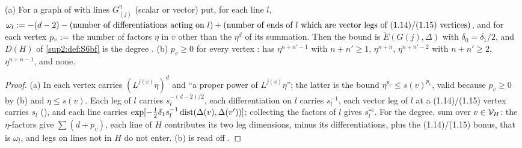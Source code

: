 \begin{lemma}\label{sup2:lem:S6inst}
\textup{(a)} For a graph of \cite[Sect.~1]{Ba3} with lines $G^\eta_{(j)}$ (scalar or vector) put, for each line $l$, $\omega_l:=-(d-2)-(\text{number of differentiations acting on }l)+(\text{number of ends of }l\text{ which are vector legs of (1.14)/(1.15) vertices})$, and for each vertex $p_v:=$ the number of factors $\eta$ in $v$ other than the $\eta^d$ of its summation. Then the bound \cite[(2.14)]{Ba3} is $\tilde E(G(j),\Delta)$ with $\delta_0=\delta_1/2$, and $D(H)$ of \cref{sup2:def:S6bf} is the degree \cite[(2.1)--(2.2)]{Ba3}. \textup{(b)} $p_v\ge0$ for every vertex \cite[(1.6)--(1.15)]{Ba3}: \cite[(1.8)]{Ba3} has $\eta^{n+n'-1}$ with $n+n'\ge1$, \cite[(1.9)]{Ba3} $\eta^{n+\bar n}$, \cite[(1.10)]{Ba3} $\eta^{n+n'-2}$ with $n+n'\ge2$, \cite[(1.11)]{Ba3} $\eta^{n+\bar n-1}$, and \cite[(1.6), (1.7), (1.13)--(1.15)]{Ba3} none.
\end{lemma}

\begin{proof}
(a) In \cite[(2.14)]{Ba3} each vertex carries $(L^{j(v)}\eta)^d$ and ``a proper power of $L^{j(v)}\eta$''; the latter is the bound $\eta^{p_v}\le s(v)^{p_v}$, valid because $p_v\ge0$ by (b) and $\eta\le s(v)$. Each leg of $l$ carries $s_l^{-(d-2)/2}$, each differentiation on $l$ carries $s_l^{-1}$, each vector leg of $l$ at a (1.14)/(1.15) vertex carries $s_l$ (\cite[(2.12)]{Ba3}), and each line carries $\exp[-\frac12\delta_1s_l^{-1}\operatorname{dist}(\Delta(v),\Delta(v'))]$; collecting the factors of $l$ gives $s_l^{\omega_l}$. For the degree, sum \cite[(2.1)]{Ba3} over $v\in\mathcal V_H$: the $\eta$-factors give $\sum(d+p_v)$, each line of $H$ contributes its two leg dimensions, minus its differentiations, plus the (1.14)/(1.15) bonus, that is $\omega_l$, and legs on lines not in $H$ do not enter. (b) is read off \cite[(1.8)--(1.15)]{Ba3}.
\end{proof}

